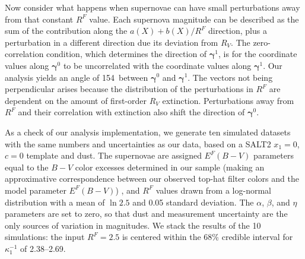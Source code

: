 \documentclass{aastex61}   	%
\begin{document}
Now consider what happens when supernovae can have small  perturbations away from that constant $R^F$ value.  Each supernova magnitude
can be described as the sum of the contribution along the $a(X)+b(X)/R^F$ direction, plus a perturbation in a different direction due its deviation  from $R_V$.
The zero-correlation condition, which determines the direction of $\pmb{\gamma}^1$,  is for the coordinate values along $\pmb{\gamma}^0$ to be uncorrelated with the coordinate values along $\pmb{\gamma}^1$.
Our analysis yields an angle of 154\arcdeg\ between  $\pmb{\gamma}^0$ and $\pmb{\gamma}^1$.
The vectors not being perpendicular arises because the distribution of the perturbations in $R^F$ are dependent on the amount of first-order $R_V$ extinction.
Perturbations away from $R^F$ and their correlation with extinction also shift the direction of $\pmb{\gamma}^0$.


\color{purple}
As a check of our analysis implementation, we generate ten simulated datasets with the same numbers and uncertainties as our data, based on a
SALT2 $x_1=0$, $c=0$ template and   dust.  The supernovae
are assigned $E^F(B-V)$ parameters equal to the $B-V$ color excesses determined in our sample
(making an approximative correspondence between our observed top-hat filter colors and the 
model parameter $E^F(B-V)$) , and $R^F$ values drawn from a log-normal
distribution with a mean of $\ln{2.5}$ and 0.05 standard deviation.  The $\alpha$, $\beta$, and $\eta$ parameters are set to zero, so that dust and
measurement uncertainty are the only sources of variation in magnitudes.  We stack the results of the 10 simulations: the input $R^F=2.5$ is centered
within the 68\% credible interval for $\kappa^{-1}_1$ of 2.38--2.69.

\color{black}
%
%
\end{document}
